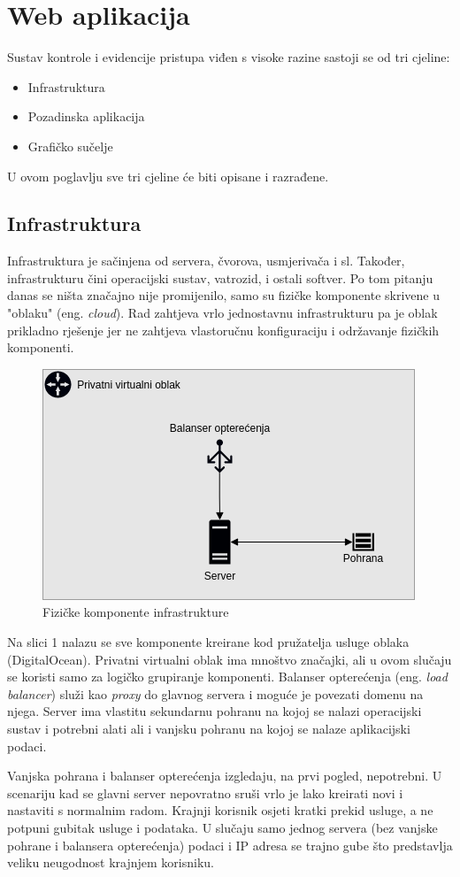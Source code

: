 \chapter{Web aplikacija}

Sustav kontrole i evidencije pristupa viđen s visoke razine sastoji se od tri cjeline:
\begin{itemize}
    \item Infrastruktura
    \item Pozadinska aplikacija
    \item Grafičko sučelje
\end{itemize}

U ovom poglavlju sve tri cjeline će biti opisane i razrađene.

\section{Infrastruktura}

Infrastruktura je sačinjena od servera, čvorova, usmjerivača i sl.
Također, infrastrukturu čini operacijski sustav, vatrozid, i ostali softver\cite{ibm-infrastructure}.
Po tom pitanju danas se ništa značajno nije promijenilo, samo su fizičke komponente skrivene u "oblaku" (eng. \textit{cloud}).
Rad zahtjeva vrlo jednostavnu infrastrukturu pa je oblak prikladno rješenje jer ne zahtjeva vlastoručnu konfiguraciju i održavanje fizičkih komponenti.

\begin{figure}[h!]
    \centering
    \includegraphics[scale=0.7]{images/infrastructure}
    \caption{Fizičke komponente infrastrukture}
\end{figure}

Na slici 1 nalazu se sve komponente kreirane kod pružatelja usluge oblaka (DigitalOcean).
Privatni virtualni oblak ima mnoštvo značajki, ali u ovom slučaju se koristi samo za logičko grupiranje komponenti.
Balanser opterećenja (eng. \textit{load balancer}) služi kao \textit{proxy} do glavnog servera i moguće je povezati domenu na njega.
Server ima vlastitu sekundarnu pohranu na kojoj se nalazi operacijski sustav i potrebni alati ali i vanjsku pohranu na kojoj se nalaze aplikacijski podaci.

Vanjska pohrana i balanser opterećenja izgledaju, na prvi pogled, nepotrebni.
U scenariju kad se glavni server nepovratno sruši vrlo je lako kreirati novi i nastaviti s normalnim radom.
Krajnji korisnik osjeti kratki prekid usluge, a ne potpuni gubitak usluge i podataka.
U slučaju samo jednog servera (bez vanjske pohrane i balansera opterećenja) podaci i IP adresa se trajno gube što predstavlja veliku
neugodnost krajnjem korisniku.
